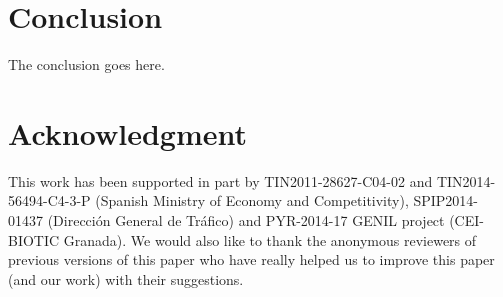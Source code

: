 \documentclass[journal,onecolumn]{IEEEtran}
\begin{document}
\section{Conclusion}
\label{sec:conclusion}

The conclusion goes here.


\section*{Acknowledgment}

This work has been supported in part by TIN2011-28627-C04-02 and
TIN2014-56494-C4-3-P (Spanish Ministry of Economy and Competitivity),
SPIP2014-01437 (Direcci{\'o}n General de Tr{\'a}fico) and PYR-2014-17
GENIL project (CEI-BIOTIC Granada). We would also like to thank the
anonymous reviewers of previous versions of this paper who have really helped us to improve
this paper (and our work) with their suggestions.




\end{document}
